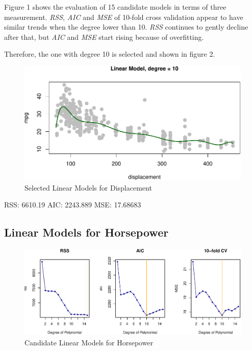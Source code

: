 \documentclass[]{article}
\begin{document}
Figure 1 shows the evaluation of 15 candidate models in terms of three
measurement. \emph{RSS}, \emph{AIC} and \emph{MSE} of 10-fold cross
validation appear to have similar trends when the degree lower than 10.
\emph{RSS} continues to gently decline after that, but \emph{AIC} and
\emph{MSE} start rising because of overfitting.

Therefore, the one with degree 10 is selected and shown in figure 2.

\begin{figure}

{\centering \includegraphics{Report_files/figure-latex/lm-d-best-1} 

}

\caption{Selected Linear Models for Displacement}\label{fig:lm-d-best}
\end{figure}

RSS: 6610.19 AIC: 2243.889 MSE: 17.68683

\hypertarget{linear-models-for-horsepower}{%
\subsection{Linear Models for
Horsepower}\label{linear-models-for-horsepower}}

\begin{figure}

{\centering \includegraphics{Report_files/figure-latex/lm-h-1} 

}

\caption{Candidate Linear Models for Horsepower}\label{fig:lm-h}
\end{figure}
\end{document}
